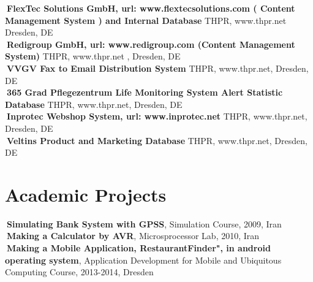 \documentclass[line,margin]{res}
\begin{document}
\begin{resume}
 \textbullet$~${\bf Flex­Tec Solutions GmbH, url: ​www.flex­tec­solutions.com​
 ( Content Management System ) and Internal Database }
 THPR, www.thpr.net  $~~~~$ \hfill  Dresden, DE\\
  \textbullet$~${\bf Redi­group GmbH, url: ​www.redi­group.com​ (Content Management System) }
 THPR, www.thpr.net , Dresden, DE\\
  \textbullet$~${\bf VVGV Fax to Email Distribution System}
 THPR, www.thpr.net, Dresden, DE\\
  \textbullet$~${\bf 365 Grad Pflegezentrum Life Monitoring System Alert Statistic Database} 
 THPR, www.thpr.net, Dresden, DE\\
  \textbullet$~${\bf Inprotec Webshop System, url: ​www.inprotec.net} 
 THPR, www.thpr.net, Dresden, DE\\
   \textbullet$~${\bf Veltins Product and Marketing Database}
 THPR, www.thpr.net, Dresden, DE\\ 
 
\section{Academic Projects}

 \textbullet$~${\bf Simulating Bank System with GPSS}, Simulation Course, 2009, Iran\\
 \textbullet$~${\bf Making a Calculator by AVR}, Microsprocessor Lab, 2010, Iran\\
 \textbullet$~${\bf Making a Mobile Application, RestaurantFinder", in android operating system}, Application Development for Mobile and Ubiquitous Computing Course, 2013-2014, Dresden\\


\end{resume}
\end{document}
